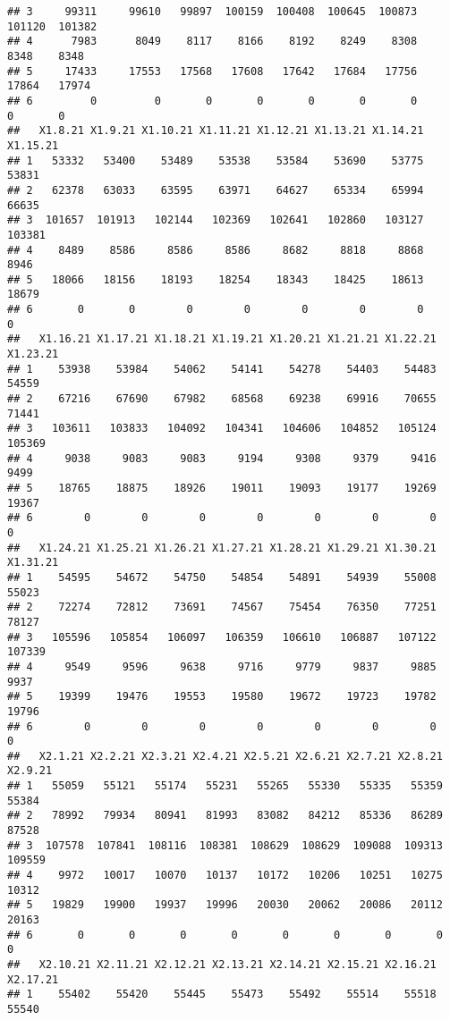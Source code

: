 \documentclass[
]{article}
\begin{document}
\begin{verbatim}
## 3     99311     99610   99897  100159  100408  100645  100873  101120  101382
## 4      7983      8049    8117    8166    8192    8249    8308    8348    8348
## 5     17433     17553   17568   17608   17642   17684   17756   17864   17974
## 6         0         0       0       0       0       0       0       0       0
##   X1.8.21 X1.9.21 X1.10.21 X1.11.21 X1.12.21 X1.13.21 X1.14.21 X1.15.21
## 1   53332   53400    53489    53538    53584    53690    53775    53831
## 2   62378   63033    63595    63971    64627    65334    65994    66635
## 3  101657  101913   102144   102369   102641   102860   103127   103381
## 4    8489    8586     8586     8586     8682     8818     8868     8946
## 5   18066   18156    18193    18254    18343    18425    18613    18679
## 6       0       0        0        0        0        0        0        0
##   X1.16.21 X1.17.21 X1.18.21 X1.19.21 X1.20.21 X1.21.21 X1.22.21 X1.23.21
## 1    53938    53984    54062    54141    54278    54403    54483    54559
## 2    67216    67690    67982    68568    69238    69916    70655    71441
## 3   103611   103833   104092   104341   104606   104852   105124   105369
## 4     9038     9083     9083     9194     9308     9379     9416     9499
## 5    18765    18875    18926    19011    19093    19177    19269    19367
## 6        0        0        0        0        0        0        0        0
##   X1.24.21 X1.25.21 X1.26.21 X1.27.21 X1.28.21 X1.29.21 X1.30.21 X1.31.21
## 1    54595    54672    54750    54854    54891    54939    55008    55023
## 2    72274    72812    73691    74567    75454    76350    77251    78127
## 3   105596   105854   106097   106359   106610   106887   107122   107339
## 4     9549     9596     9638     9716     9779     9837     9885     9937
## 5    19399    19476    19553    19580    19672    19723    19782    19796
## 6        0        0        0        0        0        0        0        0
##   X2.1.21 X2.2.21 X2.3.21 X2.4.21 X2.5.21 X2.6.21 X2.7.21 X2.8.21 X2.9.21
## 1   55059   55121   55174   55231   55265   55330   55335   55359   55384
## 2   78992   79934   80941   81993   83082   84212   85336   86289   87528
## 3  107578  107841  108116  108381  108629  108629  109088  109313  109559
## 4    9972   10017   10070   10137   10172   10206   10251   10275   10312
## 5   19829   19900   19937   19996   20030   20062   20086   20112   20163
## 6       0       0       0       0       0       0       0       0       0
##   X2.10.21 X2.11.21 X2.12.21 X2.13.21 X2.14.21 X2.15.21 X2.16.21 X2.17.21
## 1    55402    55420    55445    55473    55492    55514    55518    55540

\end{verbatim}
\end{document}

